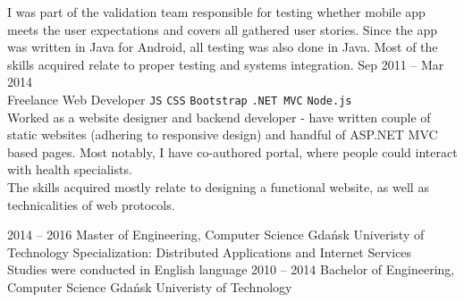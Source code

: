 \documentclass[9pt]{style/developercv}
\begin{document}
\begin{entrylist}
{			I was part of the validation team responsible for testing whether 
			mobile app meets the user expectations and covers all gathered user 
			stories. Since the app was written in  Java for Android, all testing 
			was also done in Java. Most of the skills acquired relate to proper 
			testing and systems integration.
		}
	\entry
		{Sep 2011 -- Mar 2014\\\footnotesize{Freelance}}
		{Web Developer}
		{}
		{
			\texttt{JS}\slashsep
			\texttt{CSS}\slashsep
			\texttt{Bootstrap}\slashsep
			\texttt{.NET MVC}\slashsep
			\texttt{Node.js}\\

			Worked as a website designer and backend developer - have written 
			couple of static websites (adhering to responsive design) and handful 
			of ASP.NET MVC based pages.	Most notably, I have co-authored portal, 
			where people could interact with health specialists.\\
			The skills acquired mostly relate to designing a functional website, as 
			well as technicalities of web protocols.
		}
\end{entrylist}



\begin{entrylist}
	\entry
		{2014 -- 2016}
		{Master of Engineering, Computer Science}
		{Gdańsk Univeristy of Technology}
		{
			Specialization: Distributed Applications and Internet Services \\
			Studies were conducted in English language
		}
	\entry
		{2010 -- 2014}
		{Bachelor of Engineering, Computer Science}
		{Gdańsk Univeristy of Technology}
		{}
\end{entrylist}

\end{document}
